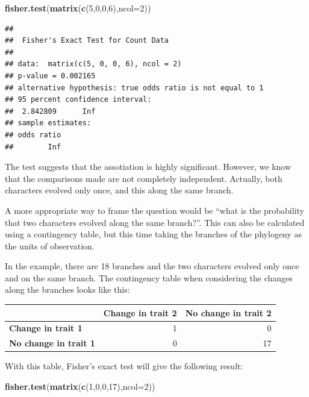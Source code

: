 \documentclass[
]{book}
\newenvironment{Shaded}{\begin{snugshade}}{\end{snugshade}}
\newcommand{\AttributeTok}[1]{\textcolor[rgb]{0.13,0.29,0.53}{#1}}
\newcommand{\DecValTok}[1]{\textcolor[rgb]{0.00,0.00,0.81}{#1}}
\newcommand{\FunctionTok}[1]{\textcolor[rgb]{0.13,0.29,0.53}{\textbf{#1}}}
\newcommand{\NormalTok}[1]{#1}
\begin{document}
\begin{Shaded}
\begin{Highlighting}[]
\FunctionTok{fisher.test}\NormalTok{(}\FunctionTok{matrix}\NormalTok{(}\FunctionTok{c}\NormalTok{(}\DecValTok{5}\NormalTok{,}\DecValTok{0}\NormalTok{,}\DecValTok{0}\NormalTok{,}\DecValTok{6}\NormalTok{),}\AttributeTok{ncol=}\DecValTok{2}\NormalTok{))}
\end{Highlighting}
\end{Shaded}

\begin{verbatim}
## 
##  Fisher's Exact Test for Count Data
## 
## data:  matrix(c(5, 0, 0, 6), ncol = 2)
## p-value = 0.002165
## alternative hypothesis: true odds ratio is not equal to 1
## 95 percent confidence interval:
##  2.842809      Inf
## sample estimates:
## odds ratio 
##        Inf
\end{verbatim}

The test suggests that the assotiation is highly significant. However, we know that the comparisons made are not completely independent. Actually, both characters evolved only once, and this along the same branch.

A more appropriate way to frame the question would be ``what is the probability that two characters evolved along the same branch?''. This can also be calculated using a contingency table, but this time taking the branches of the phylogeny as the units of observation.

In the example, there are 18 branches and the two characters evolved only once and on the same branch. The contingency table when considering the changes along the branches looks like this:

\begin{tabular}{>{}l|r|r}
\hline
  & Change in trait 2 & No change in trait 2\\
\hline
\textbf{Change in trait 1} & 1 & 0\\
\hline
\textbf{No change in trait 1} & 0 & 17\\
\hline
\end{tabular}

With this table, Fisher's exact test will give the following result:

\begin{Shaded}
\begin{Highlighting}[]
\FunctionTok{fisher.test}\NormalTok{(}\FunctionTok{matrix}\NormalTok{(}\FunctionTok{c}\NormalTok{(}\DecValTok{1}\NormalTok{,}\DecValTok{0}\NormalTok{,}\DecValTok{0}\NormalTok{,}\DecValTok{17}\NormalTok{),}\AttributeTok{ncol=}\DecValTok{2}\NormalTok{))}
\end{Highlighting}
\end{Shaded}
\end{document}
